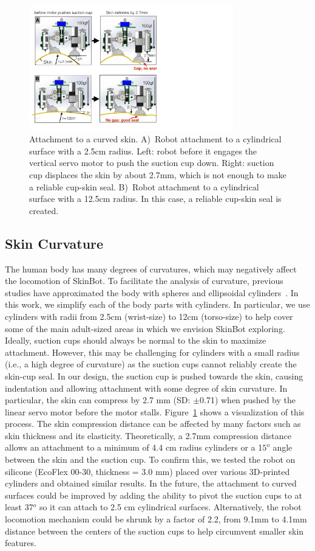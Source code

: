 \begin{figure}[!ht]
\centering
\includegraphics[width=8.9cm]{pictures/chapter3/curved_surface_attach.pdf}
\caption{Attachment to a curved skin. A)~Robot attachment to a cylindrical surface with a 2.5cm radius. Left: robot before it engages the vertical servo motor to push the suction cup down. Right: suction cup displaces the skin by about 2.7mm, which is not enough to make a reliable cup-skin seal. B)~Robot attachment to a cylindrical surface with a 12.5cm radius. In this case, a reliable cup-skin seal is created.}
\label{fig:surved_surface_attach}
\end{figure}

\subsection{Skin Curvature}
The human body has many degrees of curvatures, which may negatively affect the locomotion of SkinBot. To facilitate the analysis of curvature, previous studies have approximated the body with spheres and ellipsoidal cylinders~\cite{clauser1969weight}. In this work, we simplify each of the body parts with cylinders. In particular, we use cylinders with radii from 2.5cm (wrist-size) to 12cm (torso-size) to help cover some of the main adult-sized areas in which we envision SkinBot exploring. Ideally, suction cups should always be normal to the skin to maximize attachment. However, this may be challenging for cylinders with a small radius (i.e., a high degree of curvature) as the suction cups cannot reliably create the skin-cup seal. In our design, the suction cup is pushed towards the skin, causing indentation and allowing attachment with some degree of skin curvature. In particular, the skin can compress by 2.7 mm (SD: $\pm$0.71) when pushed by the linear servo motor before the motor stalls. Figure~\ref{fig:surved_surface_attach} shows a visualization of this process. The skin compression distance can be affected by many factors such as skin thickness and its elasticity. Theoretically, a 2.7mm compression distance allows an attachment to a minimum of 4.4 cm radius cylinders or a 1$5^o$ angle between the skin and the suction cup. To confirm this, we tested the robot on silicone (EcoFlex 00-30, thickness = 3.0 mm) placed over various 3D-printed cylinders and obtained similar results. In the future, the attachment to curved surfaces could be improved by adding the ability to pivot the suction cups to at least 37$^o$ so it can attach to 2.5 cm cylindrical surfaces. Alternatively, the robot locomotion mechanism could be shrunk by a factor of 2.2, from 9.1mm to 4.1mm distance between the centers of the suction cups to help circumvent smaller skin features. 

